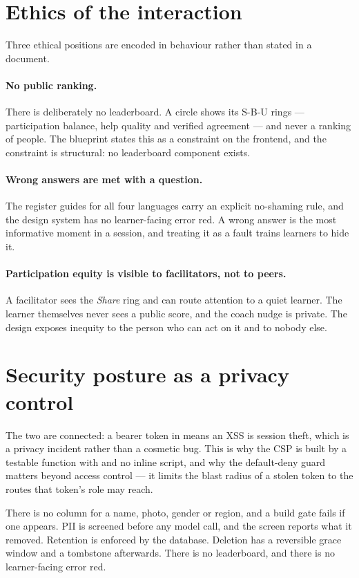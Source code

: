 \section{Ethics of the interaction}

Three ethical positions are encoded in behaviour rather than stated in a document.

\paragraph{No public ranking.} There is deliberately no leaderboard. A circle shows its
S-B-U rings --- participation balance, help quality and verified agreement --- and never a
ranking of people. The blueprint states this as a constraint on the frontend, and the
constraint is structural: no leaderboard component exists.

\paragraph{Wrong answers are met with a question.} The register guides for all four
languages carry an explicit no-shaming rule, and the design system has no learner-facing
error red. A wrong answer is the most informative moment in a session, and treating it as a
fault trains learners to hide it.

\paragraph{Participation equity is visible to facilitators, not to peers.} A facilitator
sees the \emph{Share} ring and can route attention to a quiet learner. The learner
themselves never sees a public score, and the coach nudge is private. The design exposes
inequity to the person who can act on it and to nobody else.

\section{Security posture as a privacy control}

The two are connected: a bearer token in  means an XSS is session
theft, which is a privacy incident rather than a cosmetic bug. This is why the CSP is built
by a testable function with  and no inline script, and why the
default-deny guard matters beyond access control --- it limits the blast radius of a stolen
token to the routes that token's role may reach.

\begin{keyfinding}
There is no column for a name, photo, gender or region, and a build gate fails if one
appears. PII is screened before any model call, and the screen reports what it removed.
Retention is enforced by the database. Deletion has a reversible grace window and a
tombstone afterwards. There is no leaderboard, and there is no learner-facing error red.
\end{keyfinding}
